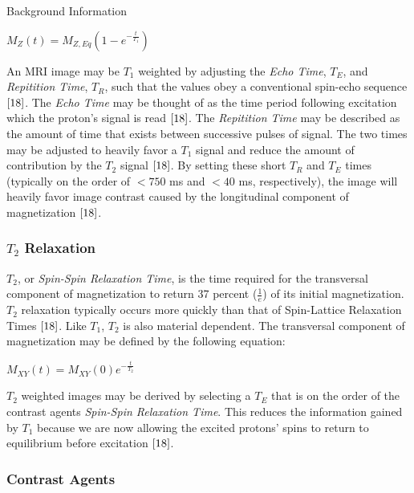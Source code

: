 \documentclass[a4paper,12pt]{article}
\begin{document}
\begin{section}{Background Information}
\begin{center}
$M_Z(t) = M_{Z,Eq}(1 - e^{-\frac{t}{T_1}})$ 
\end{center}

An MRI image may be $T_1$ weighted by adjusting the {\em Echo Time}, $T_E$, and {\em Repitition Time}, $T_R$, such that the values obey a conventional spin-echo sequence $\cite{18}$. The {\em Echo Time} may be thought of as the time period following excitation which the proton's signal is read $\cite{18}$. The {\em Repitition Time} may be described as the amount of time that exists between successive pulses of signal. The two times may be adjusted to heavily favor a $T_1$ signal and reduce the amount of contribution by the $T_2$ signal $\cite{18}$. By setting these short $T_R$ and $T_E$ times (typically on the order of $< 750$ ms and $< 40$ ms, respectively), the image will heavily favor image contrast caused by the longitudinal component of magnetization $\cite{18}$.

\subsubsection{$T_2$ Relaxation}
$T_2$, or {\em Spin-Spin Relaxation Time}, is the time required for the transversal component of magnetization to return 37 percent ($\frac{1}{e}$) of its initial magnetization. $T_2$ relaxation typically occurs more quickly than that of Spin-Lattice Relaxation Times $\cite{18}$. Like $T_1$, $T_2$ is also material dependent. The transversal component of magnetization may be defined by the following equation:

\begin{center}
$M_{XY}(t) = M_{XY}(0)e^{-\frac{t}{T_2}}$ 
\end{center}

$T_2$ weighted images may be derived by selecting a $T_E$ that is on the order of the contrast agents {\em Spin-Spin Relaxation Time}. This reduces the information gained by $T_1$ because we are now allowing the excited protons' spins to return to equilibrium before excitation $\cite{18}$.

\subsubsection{Contrast Agents}


\end{section}
\end{document}
